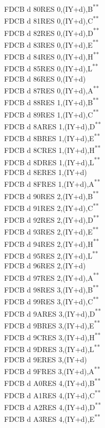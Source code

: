 \documentclass[12pt,twoside,openright,a4paper]{book}
\newcommand{\UNDOC}{\textnormal{\textsuperscript{**}}}
\begin{document}
\begin{multicols}{3}
{\begin{tabbing}
	FDCB d 80\>RES 0,(IY+d),B\UNDOC\\
	FDCB d 81\>RES 0,(IY+d),C\UNDOC\\
	FDCB d 82\>RES 0,(IY+d),D\UNDOC\\
	FDCB d 83\>RES 0,(IY+d),E\UNDOC\\
	FDCB d 84\>RES 0,(IY+d),H\UNDOC\\
	FDCB d 85\>RES 0,(IY+d),L\UNDOC\\
	FDCB d 86\>RES 0,(IY+d)\\
	FDCB d 87\>RES 0,(IY+d),A\UNDOC\\
	FDCB d 88\>RES 1,(IY+d),B\UNDOC\\
	FDCB d 89\>RES 1,(IY+d),C\UNDOC\\
	FDCB d 8A\>RES 1,(IY+d),D\UNDOC\\
	FDCB d 8B\>RES 1,(IY+d),E\UNDOC\\
	FDCB d 8C\>RES 1,(IY+d),H\UNDOC\\
	FDCB d 8D\>RES 1,(IY+d),L\UNDOC\\
	FDCB d 8E\>RES 1,(IY+d)\\
	FDCB d 8F\>RES 1,(IY+d),A\UNDOC\\
	FDCB d 90\>RES 2,(IY+d),B\UNDOC\\
	FDCB d 91\>RES 2,(IY+d),C\UNDOC\\
	FDCB d 92\>RES 2,(IY+d),D\UNDOC\\
	FDCB d 93\>RES 2,(IY+d),E\UNDOC\\
	FDCB d 94\>RES 2,(IY+d),H\UNDOC\\
	FDCB d 95\>RES 2,(IY+d),L\UNDOC\\
	FDCB d 96\>RES 2,(IY+d)\\
	FDCB d 97\>RES 2,(IY+d),A\UNDOC\\
	FDCB d 98\>RES 3,(IY+d),B\UNDOC\\
	FDCB d 99\>RES 3,(IY+d),C\UNDOC\\
	FDCB d 9A\>RES 3,(IY+d),D\UNDOC\\
	FDCB d 9B\>RES 3,(IY+d),E\UNDOC\\
	FDCB d 9C\>RES 3,(IY+d),H\UNDOC\\
	FDCB d 9D\>RES 3,(IY+d),L\UNDOC\\
	FDCB d 9E\>RES 3,(IY+d)\\
	FDCB d 9F\>RES 3,(IY+d),A\UNDOC\\
	FDCB d A0\>RES 4,(IY+d),B\UNDOC\\
	FDCB d A1\>RES 4,(IY+d),C\UNDOC\\
	FDCB d A2\>RES 4,(IY+d),D\UNDOC\\
	FDCB d A3\>RES 4,(IY+d),E\UNDOC\\

\end{tabbing}}
\end{multicols}
\end{document}
